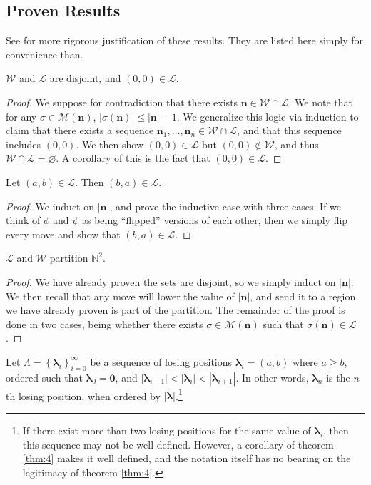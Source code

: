 \documentclass[11pt, letterpaper]{article}
\begin{document}
\subsection{Proven Results}
See \cite{exc} for more rigorous justification of these results. They are listed here simply for convenience than.
\begin{theorem}\label{thm:1}
	$\mathcal{W} $ and $\mathcal{L} $ are disjoint, and $\left( 0,0 \right) \in \mathcal{L} $.
\end{theorem}
\begin{proof}
	We suppose for contradiction that there exists $\mathbf{n}\in \mathcal{W} \cap \mathcal{L} $. We note that for any $\sigma \in \mathscr{M} (\mathbf{n})$, $\left| \sigma (\mathbf{n}) \right| \leq \left| \mathbf{n} \right| -1$. We generalize this logic via induction to claim that there exists a sequence $\mathbf{n}_1, \dots, \mathbf{n}_n \in \mathcal{W} \cap \mathcal{L} $, and that this sequence includes $(0,0)$. We then show $(0,0)\in \mathcal{L} $ but $(0,0)\notin \mathcal{W} $, and thus $\mathcal{W} \cap \mathcal{L} =\varnothing$. A corollary of this is the fact that $(0,0)\in \mathcal{L} $.
\end{proof}
\begin{theorem}\label{thm:2}
	Let $(a,b)\in \mathcal{L} $. Then $(b,a)\in \mathcal{L} $.
\end{theorem}
\begin{proof}
	We induct on $\left| \mathbf{n} \right| $, and prove the inductive case with three cases. If we think of $\phi $ and $\psi $ as being ``flipped'' versions of each other, then we simply flip every move and show that $(b,a)\in \mathcal{L} $.
\end{proof}
\begin{theorem}\label{thm:3}
	$\mathcal{L} $ and $\mathcal{W} $ partition $\mathbb{N}^2$.
\end{theorem}
\begin{proof}
	We have already proven the sets are disjoint, so we simply induct on $\left| \mathbf{n} \right| $. We then recall that any move will lower the value of $\left| \mathbf{n} \right| $, and send it to a region we have already proven is part of the partition. The remainder of the proof is done in two cases, being whether there exists $\sigma \in \mathscr{M} (\mathbf{n})$ such that $\sigma (\mathbf{n})\in \mathcal{L} $.
\end{proof}
\begin{notation}
	Let $\Lambda =\left\{ \boldsymbol{\lambda} _i \right\}_{i=0}^\infty $ be a sequence of losing positions $\boldsymbol{\lambda}_i=(a,b)$ where $a\geq b$, ordered such that $\boldsymbol{\lambda}_0=\mathbf{0}$, and $\left| \boldsymbol{\lambda}_{i-1} \right| < \left| \boldsymbol{\lambda}_{i} \right| < \left| \boldsymbol{\lambda}_{i+1} \right| $. In other words, $\boldsymbol{\lambda}_n$ is the $n$th losing position, when ordered by $\left| \boldsymbol{\lambda}  \right| $.\footnote{If there exist more than two losing positions for the same value of $\boldsymbol{\lambda}_i$, then this sequence may not be well-defined. However, a corollary of theorem \ref{thm:4} makes it well defined, and the notation itself has no bearing on the legitimacy of theorem \ref{thm:4}.}
\end{notation}
\end{document}
